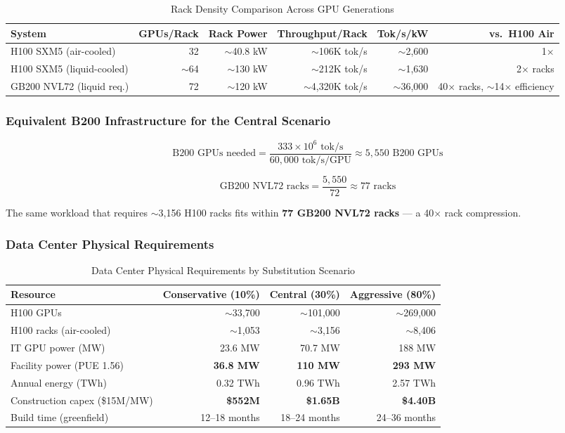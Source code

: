 \documentclass{article}
\begin{document}
\begin{table}[ht]
\centering
\caption{Rack Density Comparison Across GPU Generations}
\label{tab:rack-density}
\small
\begin{tabular}{@{}lrrrrr@{}}
\toprule
\textbf{System} & \textbf{GPUs/Rack} & \textbf{Rack Power} & \textbf{Throughput/Rack} & \textbf{Tok/s/kW} & \textbf{vs.\ H100 Air} \\
\midrule
H100 SXM5 (air-cooled) & 32 & $\sim$40.8 kW & $\sim$106K tok/s & $\sim$2,600 & 1$\times$ \\
H100 SXM5 (liquid-cooled) & $\sim$64 & $\sim$130 kW & $\sim$212K tok/s & $\sim$1,630 & 2$\times$ racks \\
GB200 NVL72 (liquid req.) & 72 & $\sim$120 kW & $\sim$4,320K tok/s & $\sim$36,000 & 40$\times$ racks, $\sim$14$\times$ efficiency \\
\bottomrule
\end{tabular}
\end{table}

\subsubsection*{Equivalent B200 Infrastructure for the Central Scenario}

\[
\text{B200 GPUs needed} = \frac{333 \times 10^6 \text{ tok/s}}{60{,}000 \text{ tok/s/GPU}} \approx 5{,}550 \text{ B200 GPUs}
\]

\[
\text{GB200 NVL72 racks} = \frac{5{,}550}{72} \approx 77 \text{ racks}
\]

The same workload that requires $\sim$3,156 H100 racks fits within \textbf{77 GB200 NVL72
racks} --- a 40$\times$ rack compression.

\subsubsection{Data Center Physical Requirements}

\begin{table}[ht]
\centering
\caption{Data Center Physical Requirements by Substitution Scenario}
\label{tab:physical-requirements}
\small
\begin{tabular}{@{}lrrr@{}}
\toprule
\textbf{Resource} & \textbf{Conservative (10\%)} & \textbf{Central (30\%)} & \textbf{Aggressive (80\%)} \\
\midrule
H100 GPUs & $\sim$33,700 & $\sim$101,000 & $\sim$269,000 \\
H100 racks (air-cooled) & $\sim$1,053 & $\sim$3,156 & $\sim$8,406 \\
IT GPU power (MW) & 23.6 MW & 70.7 MW & 188 MW \\
Facility power (PUE 1.56) & \textbf{36.8 MW} & \textbf{110 MW} & \textbf{293 MW} \\
Annual energy (TWh) & 0.32 TWh & 0.96 TWh & 2.57 TWh \\
Construction capex (\$15M/MW) & \textbf{\$552M} & \textbf{\$1.65B} & \textbf{\$4.40B} \\
Build time (greenfield) & 12--18 months & 18--24 months & 24--36 months \\
\bottomrule
\end{tabular}
\end{table}
\end{document}
